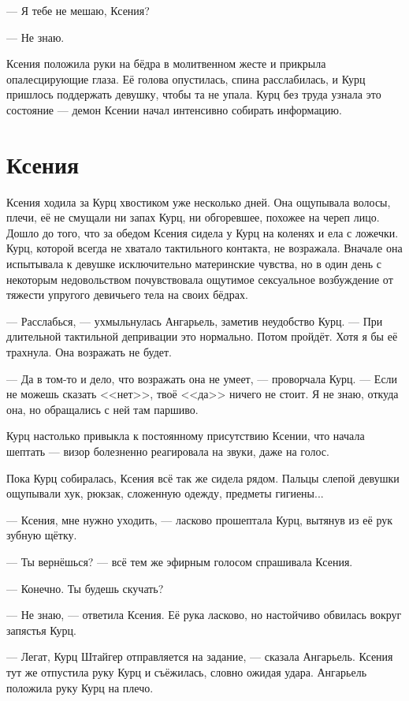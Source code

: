 --- Я тебе не мешаю, Ксения?

--- Не знаю.

Ксения положила руки на бёдра в молитвенном жесте и прикрыла опалесцирующие глаза.
Её голова опустилась, спина расслабилась, и Курц пришлось поддержать девушку, чтобы та не упала.
Курц без труда узнала это состояние --- демон Ксении начал интенсивно собирать информацию.

\section{Ксения}

Ксения ходила за Курц хвостиком уже несколько дней.
Она ощупывала волосы, плечи, её не смущали ни запах Курц, ни обгоревшее, похожее на череп лицо.
Дошло до того, что за обедом Ксения сидела у Курц на коленях и ела с ложечки.
Курц, которой всегда не хватало тактильного контакта, не возражала.
Вначале она испытывала к девушке исключительно материнские чувства, но в один день с некоторым недовольством почувствовала ощутимое сексуальное возбуждение от тяжести упругого девичьего тела на своих бёдрах.

--- Расслабься, --- ухмыльнулась Ангарьель, заметив неудобство Курц.
--- При длительной тактильной депривации это нормально.
Потом пройдёт.
Хотя я бы её трахнула.
Она возражать не будет.

--- Да в том-то и дело, что возражать она не умеет, --- проворчала Курц.
--- Если не можешь сказать <<нет>>, твоё <<да>> ничего не стоит.
Я не знаю, откуда она, но обращались с ней там паршиво.

Курц настолько привыкла к постоянному присутствию Ксении, что начала шептать --- визор болезненно реагировала на звуки, даже на голос.

Пока Курц собиралась, Ксения всё так же сидела рядом.
Пальцы слепой девушки ощупывали хук, рюкзак, сложенную одежду, предметы гигиены...

--- Ксения, мне нужно уходить, --- ласково прошептала Курц, вытянув из её рук зубную щётку.

--- Ты вернёшься? --- всё тем же эфирным голосом спрашивала Ксения.

--- Конечно.
Ты будешь скучать?

--- Не знаю, --- ответила Ксения.
Её рука ласково, но настойчиво обвилась вокруг запястья Курц.

--- Легат, Курц Штайгер отправляется на задание, --- сказала Ангарьель.
Ксения тут же отпустила руку Курц и съёжилась, словно ожидая удара.
Ангарьель положила руку Курц на плечо.

